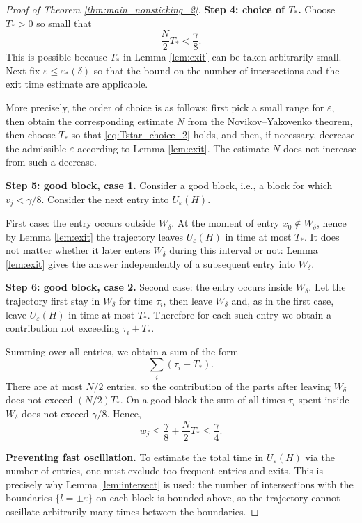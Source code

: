 \documentclass[11pt]{article}
\newcommand{\eps}{\varepsilon}
\theoremstyle{thmstyleone}
\theoremstyle{thmstyletwo}
\theoremstyle{thmstylethree}
\begin{document}
\begin{appendices}
\begin{proof}[Proof of Theorem \ref{thm:main_nonsticking_2}]
\textbf{Step 4: choice of $T_*$.}
Choose $T_*>0$ so small that
\begin{equation}\label{eq:Tstar_choice_2}
    \frac{N}{2}T_*<\frac\gamma8.
\end{equation}
This is possible because $T_*$ in Lemma \ref{lem:exit} can be taken arbitrarily small. Next fix $\eps\le\eps_*(\delta)$ so that the bound on the number of intersections and the exit time estimate are applicable.

More precisely, the order of choice is as follows: first pick a small range for $\eps$, then obtain the corresponding estimate $N$ from the Novikov–Yakovenko theorem, then choose $T_*$ so that \eqref{eq:Tstar_choice_2} holds, and then, if necessary, decrease the admissible $\eps$ according to Lemma \ref{lem:exit}. The estimate $N$ does not increase from such a decrease.

\textbf{Step 5: good block, case 1.}
Consider a good block, i.e., a block for which $v_j<\gamma/8$. Consider the next entry into $U_\eps(H)$.

First case: the entry occurs outside $W_\delta$. At the moment of entry $x_0\notin W_\delta$, hence by Lemma \ref{lem:exit} the trajectory leaves $U_\eps(H)$ in time at most $T_*$. It does not matter whether it later enters $W_\delta$ during this interval or not: Lemma \ref{lem:exit} gives the answer independently of a subsequent entry into $W_\delta$.

\textbf{Step 6: good block, case 2.}
Second case: the entry occurs inside $W_\delta$. Let the trajectory first stay in $W_\delta$ for time $\tau_i$, then leave $W_\delta$ and, as in the first case, leave $U_\eps(H)$ in time at most $T_*$. Therefore for each such entry we obtain a contribution not exceeding $\tau_i+T_*$.

Summing over all entries, we obtain a sum of the form
\[
    \sum_i(\tau_i+T_*).
\]
There are at most $N/2$ entries, so the contribution of the parts after leaving $W_\delta$ does not exceed $(N/2)T_*$. On a good block the sum of all times $\tau_i$ spent inside $W_\delta$ does not exceed $\gamma/8$. Hence,
\begin{equation}\label{eq:good_block_2}
    w_j\le\frac\gamma8+\frac{N}{2}T_*\le\frac\gamma4.
\end{equation}

\textbf{Preventing fast oscillation.}
To estimate the total time in $U_\eps(H)$ via the number of entries, one must exclude too frequent entries and exits. This is precisely why Lemma \ref{lem:intersect} is used: the number of intersections with the boundaries $\{l=\pm\eps\}$ on each block is bounded above, so the trajectory cannot oscillate arbitrarily many times between the boundaries.


\end{proof}
\end{appendices}
\end{document}
